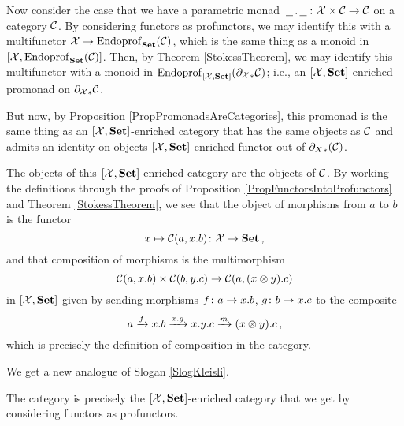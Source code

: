 Now consider the case that we have a parametric monad $\,\underline{\hspace{1.5ex}}\,.\,\underline{\hspace{1.5ex}}\,\colon\mathcal X \times {\mathcal{C}} \to {\mathcal{C}}$ on a category ${\mathcal{C}}$.  
By considering functors as profunctors, we may identify this with a multifunctor $\mathcal X \to \operatorname{Endoprof}_{\normalfont\textbf{Set}}({\mathcal{C}})$, which is the same thing as a monoid in $[\mathcal X,\operatorname{Endoprof}_{\normalfont\textbf{Set}}({\mathcal{C}})]$.
Then, by Theorem \ref{StokessTheorem}, we may identify this multifunctor with a monoid in $\operatorname{Endoprof}_{[\mathcal X,{\normalfont\textbf{Set}}]}({\partial_\mathcal X}_*{\mathcal{C}})$; i.e., an $[\mathcal X,{\normalfont\textbf{Set}}]$-enriched promonad on ${\partial_\mathcal X}_*{\mathcal{C}}$.

But now, by Proposition \ref{PropPromonadsAreCategories}, this promonad is the same thing as an $[\mathcal X,{\normalfont\textbf{Set}}]$-enriched category that has the same objects as ${\mathcal{C}}$ and admits an identity-on-objects $[\mathcal X,{\normalfont\textbf{Set}}]$-enriched functor out of ${\partial_X}_*({\mathcal{C}})$.  

The objects of this $[\mathcal X,{\normalfont\textbf{Set}}]$-enriched category are the objects of ${\mathcal{C}}$.
By working the definitions through the proofs of Proposition \ref{PropFunctorsIntoProfunctors} and Theorem \ref{StokessTheorem}, we see that the object of morphisms from $a$ to $b$ is the functor
\[
  x \mapsto {\mathcal{C}}(a,x.b)\colon \mathcal X \to {\normalfont\textbf{Set}}\,,
  \]
and that composition of morphisms is the multimorphism
\[
  {\mathcal{C}}(a,x.b) \times {\mathcal{C}}(b,y.c) \to {\mathcal{C}}(a,(x\otimes y).c)
  \]
in $[\mathcal X,{\normalfont\textbf{Set}}]$ given by sending morphisms $f\colon a \to x.b$, $g\colon b \to x.c$ to the composite
\[
  a
  \xrightarrow{f}
  x.b
  \xrightarrow{x.g}
  x.y.c \xrightarrow{m}
  (x\otimes y).c\,,
  \]
which is precisely the definition of composition in the \Mellies category.

We get a new analogue of Slogan \ref{SlogKleisli}.

\begin{slogan}
  The \Mellies category is precisely the $[\mathcal X,{\normalfont\textbf{Set}}]$-enriched category that we get by considering functors as profunctors.
\end{slogan}
